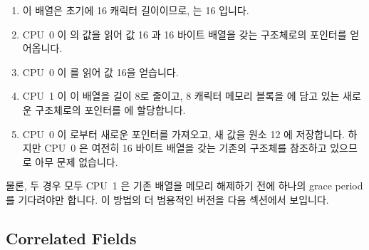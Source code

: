 \begin{enumerate}
\item	이 배열은 초기에 16 캐릭터 길이이므로,  는 16 입니다.
\item	CPU~0 이  의 값을 읽어 값 16 과 16 바이트 배열을 갖는
	구조체로의 포인터를 얻어옵니다.
\item	CPU~0 이  를 읽어 값 16을 얻습니다.
\item	CPU~1 이 이 배열을 길이 8로 줄이고, 8 캐릭터 메모리 블록을 에 담고 있는
	새로운  구조체로의 포인터를  에 할당합니다.
\item	CPU~0 이  로부터 새로운 포인터를 가져오고, 새 값을 원소 12 에
	저장합니다.
	하지만 CPU~0 은 여전히 16 바이트 배열을 갖는 기존의  구조체를
	참조하고 있으므로 아무 문제 없습니다.

\iffalse

\item	The array is initially 16 characters long, and thus \co{->length}
	is equal to 16.
\item	CPU~0 loads the value of \co{->fa}, obtaining a pointer to
	the structure containing the value 16 and the 16-byte array.
\item	CPU~0 loads the value of \co{->fa->length}, obtaining the value 16.
\item	CPU~1 shrinks the array to be of length 8, and assigns a pointer
	to a new \co{foo_a} structure containing an 8-character block
	of memory into \co{->fa}.
\item	CPU~0 picks up the new pointer from \co{->a[]}, and stores a
	new value into element 12.
	But because CPU~0 is still referencing the old \co{foo_a}
	structure that contains the 16-byte array, all is well.

\fi

\end{enumerate}

물론, 두 경우 모두 CPU~1 은 기존 배열을 메모리 해제하기 전에 하나의 grace
period 를 기다려야만 합니다.
이 방법의 더 범용적인 버전을 다음 섹션에서 보입니다.

\iffalse

Of course, in both cases, CPU~1 must wait for a grace period before
freeing the old array.

A more general version of this approach is presented in the next section.

\fi

\subsection{Correlated Fields}
\label{sec:together:Correlated Fields}

